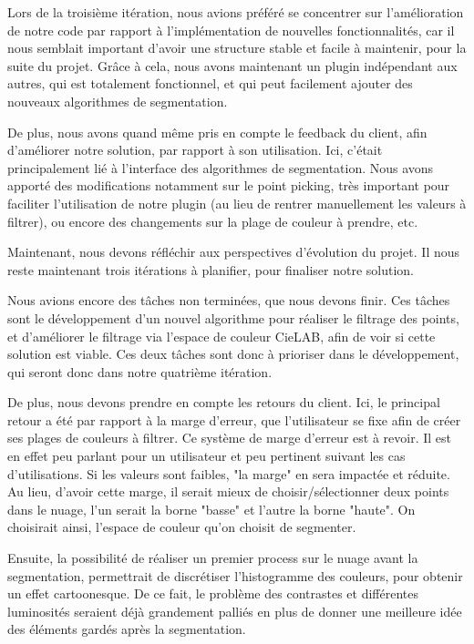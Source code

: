 \documentclass[12pt,titlepage,french]{article}
\begin{document}
Lors de la troisième itération, nous avions préféré se concentrer sur l'amélioration de notre code par rapport à l'implémentation de nouvelles fonctionnalités, car il nous semblait important d'avoir une structure stable et facile à maintenir, pour la suite du projet. Grâce à cela, nous avons maintenant un plugin indépendant aux autres, qui est totalement fonctionnel, et qui peut facilement ajouter des nouveaux algorithmes de segmentation.

De plus, nous avons quand même pris en compte le feedback du client, afin d'améliorer notre solution, par rapport à son utilisation. Ici, c'était principalement lié à l'interface des algorithmes de segmentation. Nous avons apporté des modifications notamment sur le point picking, très important pour faciliter l'utilisation de notre plugin (au lieu de rentrer manuellement les valeurs à filtrer), ou encore des changements sur la plage de couleur à prendre, etc. \newline

Maintenant, nous devons réfléchir aux perspectives d'évolution du projet. Il nous reste maintenant trois itérations à planifier, pour finaliser notre solution. \newline

Nous avions encore des tâches non terminées, que nous devons finir. Ces tâches sont le développement d'un nouvel algorithme pour réaliser le filtrage des points, et d'améliorer le filtrage via l'espace de couleur CieLAB, afin de voir si cette solution est viable. Ces deux tâches sont donc à prioriser dans le développement, qui seront donc dans notre quatrième itération.

De plus, nous devons prendre en compte les retours du client. Ici, le principal retour a été par rapport à la marge d'erreur, que l'utilisateur se fixe afin de créer ses plages de couleurs à filtrer. Ce système de marge d'erreur est à revoir. Il est en effet peu parlant pour un utilisateur et peu pertinent suivant les cas d'utilisations. Si les valeurs sont faibles, "la marge" en sera impactée et réduite. Au lieu, d'avoir cette marge, il serait mieux de choisir/sélectionner deux points dans le nuage, l'un serait la borne "basse" et l'autre la borne "haute". On choisirait ainsi, l'espace de couleur qu'on choisit de segmenter.

Ensuite, la possibilité de réaliser un premier process sur le nuage avant la segmentation, permettrait de discrétiser l'histogramme des couleurs, pour obtenir un effet cartoonesque. De ce fait, le problème des contrastes et différentes luminosités seraient déjà grandement palliés en plus de donner une meilleure idée des éléments gardés après la segmentation.
\end{document}
